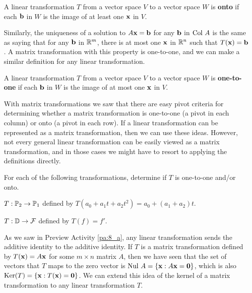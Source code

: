 \begin{definition} A linear transformation $T$ from a vector space $V$ to a vector space $W$ is \textbf{onto} if each $\mathbf{b}$ in $W$ is the image of at least one $\mathbf{x}$ in $V$.
\end{definition}

Similarly, the uniqueness of a solution to $A \mathbf{x} = \mathbf{b}$ for any $\mathbf{b}$ in $\text{Col } A$ is the same as saying that for any $\mathbf{b}$ in $\mathbb{R}^m$, there is at most one $\mathbf{x}$ in $\mathbb{R}^n$ such that $T(\mathbf{x}) = \mathbf{b}$. A matrix transformation with this property is one-to-one, and we can make a similar definition for any linear transformation. 

\begin{definition} A linear transformation $T$ from a vector space $V$ to a vector space $W$ is \textbf{one-to-one} if each $\mathbf{b}$ in $W$ is the image of at most one $\mathbf{x}$ in $V$.
\end{definition}

With matrix transformations we saw that there are easy pivot criteria for determining whether a matrix transformation is one-to-one (a pivot in each column) or onto (a pivot in each row). If a linear transformation can be represented as a matrix transformation, then we can use these ideas. However, not every general linear transformation can be easily viewed as a matrix transformation, and in those cases we might have to resort to applying the definitions directly.

\begin{activity}
For each of the following transformations, determine if $T$ is one-to-one and/or onto.
	\ba
	\item $T: \mathbb{P}_2 \to \mathbb{P}_1$ defined by $T(a_0+a_1t+a_2t^2) = a_0+(a_1+a_2)t$.
	\item $T: \mathbb{D} \to \mathcal{F}$ defined by $T(f) = f'$.
	\ea
\end{activity}



\label{sec:kernel_range}

As we saw in Preview Activity \ref{pa:8_a}, any linear transformation sends the additive identity to the additive identity. If $T$ is a matrix transformation defined by $T(\mathbf{x}) = A \mathbf{x}$ for some $m \times n$ matrix $A$, then we have seen that the set of vectors that $T$ maps to the zero vector is $\text{Nul } A = \{\mathbf{x} : A \mathbf{x} = \mathbf{0}\}$, which is also $\text{Ker}(T) = \{\mathbf{x} : T(\mathbf{x}) = \mathbf{0}\}$. We can extend this idea of the kernel of a matrix transformation to any linear transformation $T$. 

